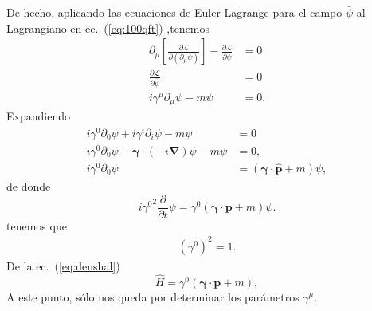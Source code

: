 De hecho, aplicando las ecuaciones de Euler-Lagrange para el campo $\bar{\psi}$ al Lagrangiano en ec.~(\ref{eq:100qft}) ,tenemos
\begin{align}
  \partial_\mu\left[\frac{\partial\mathcal{L}}{\partial\left(\partial_\mu\bar{\psi}\right)}\right]-\frac{\partial\mathcal{L}}{\partial\bar{\psi}}&=0\nonumber\\
  \frac{\partial\mathcal{L}}{\partial\bar{\psi}}&=0\nonumber\\
  \label{eq:114qftm}
  i\gamma^\mu\partial_\mu\psi-m\psi&=0.
\end{align}
Expandiendo
\begin{align*}
  i\gamma^0\partial_0\psi+i\gamma^i\partial_i\psi-m\psi&=0\\
  i\gamma^0\partial_0\psi-\boldsymbol{\gamma}\cdot(-i\boldsymbol{\nabla})\psi-m\psi&=0,\\
  i\gamma^0\partial_0\psi&=(\boldsymbol{\gamma}\cdot\hat{\mathbf{p}}+m)\psi,
\end{align*}
de donde
\begin{equation}
    i{\gamma^0}^2\frac{\partial}{\partial t}\psi=\gamma^0(\boldsymbol{\gamma}\cdot\mathbf{p}+m)\psi.
\end{equation}
 tenemos que
\begin{align}
  \label{eq:gamma02}
  \left(\gamma^0\right)^2=1.
\end{align}
De la ec.~(\ref{eq:denshal})
\begin{equation}
  \label{eq:186qft}
  \hat{H}= \gamma^0(\boldsymbol{\gamma}\cdot\mathbf{p}+m),
\end{equation}
A este punto, sólo nos queda por determinar los parámetros $\gamma^\mu$. 

